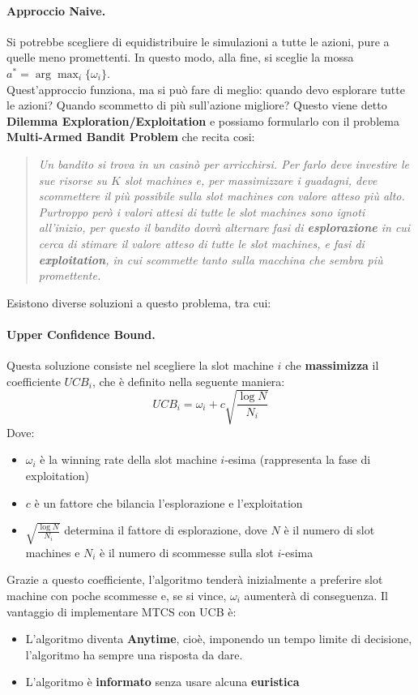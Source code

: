 \paragraph{Approccio Naive.}Si potrebbe scegliere di equidistribuire le simulazioni a tutte le azioni, pure a quelle
meno promettenti. In questo modo, alla fine, si sceglie la mossa $a^* = \arg \max_i \{\omega_i\}$.\\

Quest'approccio funziona, ma si può fare di meglio: quando devo esplorare tutte le azioni? Quando scommetto di più sull'azione
migliore? Questo viene detto \textbf{Dilemma Exploration/Exploitation} e possiamo formularlo con il problema \textbf{Multi-Armed Bandit Problem} che recita cosi:
\begin{quote}
   \textit{ Un bandito si trova in un casinò per arricchirsi. Per farlo deve investire le sue risorse su $K$ slot machines e, per
    massimizzare i guadagni, deve scommettere il più possibile sulla slot machines con valore atteso più alto. Purtroppo però
    i valori attesi di tutte le slot machines sono ignoti all'inizio, per questo il bandito dovrà alternare fasi di \textbf{esplorazione}
    in cui cerca di stimare il valore atteso di tutte le slot machines, e fasi di \textbf{exploitation}, in cui scommette tanto sulla macchina
    che sembra più promettente. }
\end{quote}
Esistono diverse soluzioni a questo problema, tra cui:
\paragraph{Upper Confidence Bound.}Questa soluzione consiste nel scegliere la slot machine $i$ che \textbf{massimizza}
il coefficiente $UCB_i$, che è definito nella seguente maniera:
\begin{equation}
    UCB_i = \omega_i + c\sqrt{\frac{\log N}{N_i}}
\end{equation}
Dove:
\begin{itemize}
    \item $\omega_i$ è la winning rate della slot machine $i$-esima (rappresenta la fase di exploitation)
    \item $c$ è un fattore che bilancia l'esplorazione e l'exploitation
    \item $\sqrt{\frac{\log N}{N_i}}$ determina il fattore di esplorazione, dove $N$ è il numero di slot machines e $N_i$ è il numero di scommesse sulla slot $i$-esima
\end{itemize}
Grazie a questo coefficiente, l'algoritmo tenderà inizialmente a preferire slot machine con poche scommesse e, se si vince, $\omega_i$ aumenterà di conseguenza.
Il vantaggio di implementare MTCS con UCB è:
\begin{itemize}
    \item L'algoritmo diventa \textbf{Anytime}, cioè, imponendo un tempo limite di decisione, l'algoritmo ha sempre una risposta da dare.
    \item L'algoritmo è \textbf{informato} senza usare alcuna \textbf{euristica}
\end{itemize}

